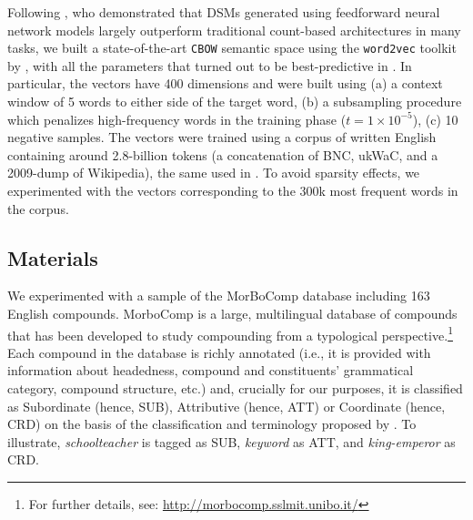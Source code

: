 \documentclass[output=paper]{langsci/langscibook}
\begin{document}
Following \cite{baronipredict}, who demonstrated that DSMs generated using feedforward neural network models largely outperform traditional count-based architectures in many tasks, we built a state-of-the-art \texttt{CBOW} semantic space using the \texttt{word2vec} toolkit by \cite{mikolov2013}, with all the parameters that turned out to be best-predictive in \cite{baronipredict}. In particular, the vectors have 400 dimensions and were built using (a) a context window of 5 words to either side of the target word, (b) a subsampling procedure which penalizes high-frequency words in the training phase ($t = 1\times10^{-5}$), (c) 10 negative samples. The vectors were trained using a corpus of written English containing around 2.8-billion tokens (a concatenation of BNC, ukWaC, and a 2009-dump of Wikipedia), the same used in \cite{baronipredict}. To avoid sparsity effects, we experimented with the vectors corresponding to the 300k most frequent words in the corpus.


\subsection{Materials}

We experimented with a sample of the MorBoComp database including 163 English compounds. MorboComp is a large, multilingual database of compounds that has been developed to study compounding from a typological perspective.\footnote{For further details, see: \url{http://morbocomp.sslmit.unibo.it/}} Each compound in the database is richly annotated (i.e., it is provided with information about headedness, compound and constituents' grammatical category, compound structure, etc.) and, crucially for our purposes, it is classified as Subordinate (hence, SUB), Attributive (hence, ATT) or Coordinate (hence, CRD) on the basis of the classification and terminology proposed by \cite{SB2005}. To illustrate, \emph{schoolteacher} is tagged as SUB, \emph{keyword} as ATT, and \emph{king-emperor} as CRD.
\end{document}
